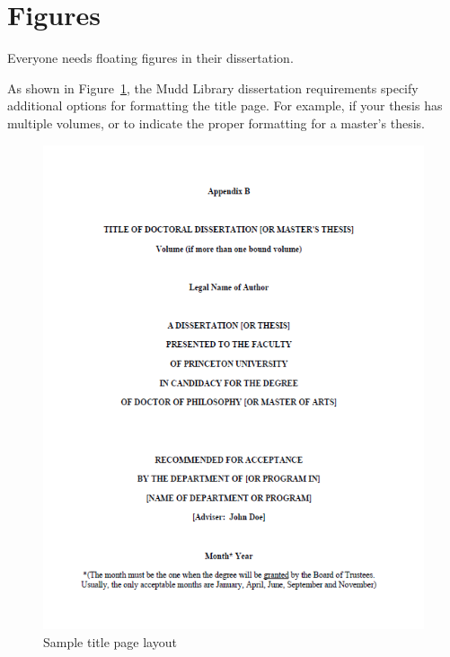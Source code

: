 \section{Figures}
\label{sec:pastwork:figures}

Everyone needs floating figures in their dissertation. 

As shown in Figure~\ref{fig:pastwork:titlepage}, the Mudd Library dissertation requirements specify additional options for formatting the title page. For example, if your thesis has multiple volumes, or to indicate the proper formatting for a master's thesis.

\begin{figure}[htb]
  \begin{center}
    \includegraphics[width=0.9\linewidth]{ch-pastwork/figures/titlepage}
    \caption[Sample Title Page Layout]{Sample title page layout}
    \label{fig:pastwork:titlepage}
  \end{center}
\end{figure}
